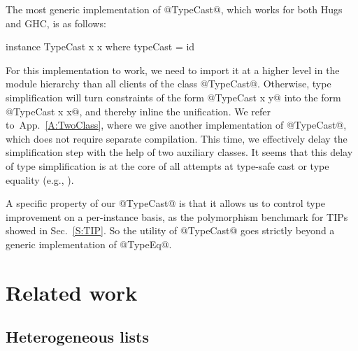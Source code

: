 \documentclass[nocopyrightspace,preprint]{sigplan-proc}
\newcommand{\hwVsTr}[2]{#2}
\begin{document}
The most generic implementation of @TypeCast@, which works for both
Hugs and GHC, is as follows:

\begin{code}
 instance TypeCast x x where typeCast = id
\end{code}

For this implementation to work, we need to import it at a higher
level in the module hierarchy than all clients of the class
@TypeCast@. Otherwise, type simplification will turn constraints of
the form @TypeCast x y@ into the form @TypeCast x x@, and thereby
inline the unification. We refer
to~\hwVsTr{\cite{HList}}{App.~\ref{A:TwoClass}}, where we give another
implementation of @TypeCast@, which does not require separate
compilation. This time, we effectively delay the simplification step
with the help of two auxiliary classes. It seems that this delay of
type simplification is at the core of all attempts at type-safe cast
or type equality (e.g., \cite{BS02}).

A specific property of our @TypeCast@ is that it allows us to control
type improvement on a per-instance basis, as the polymorphism
benchmark for TIPs showed in Sec.~\ref{S:TIP}. So the utility of
@TypeCast@ goes strictly beyond a generic implementation of @TypeEq@.






\section{Related work}
\label{S:related}

\medskip

\subsection*{Heterogeneous lists}
\end{document}
